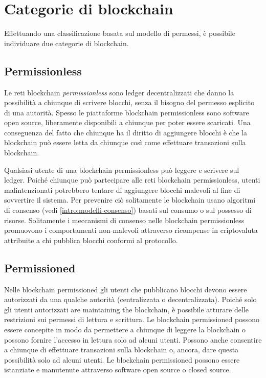 \section{Categorie di blockchain}
Effettuando una classificazione basata sul modello di permessi,
è possibile individuare due categorie di blockchain.

\subsection{Permissionless}
\label{intro:permissionless}
Le reti blockchain \textit{permissionless} sono ledger decentralizzati che danno la possibilità
a chiunque di scrivere blocchi, senza il bisogno del permesso esplicito di una autorità.
Spesso le piattaforme blockchain permissionless sono software open source, liberamente
disponibili a chiunque per poter essere scaricati. Una conseguenza del fatto che
chiunque ha il diritto di aggiungere blocchi è che la blockchain può essere letta da chiunque
così come effettuare transazioni sulla blockchain.

Qualsiasi utente di una blockchain permissionless può leggere e scrivere sul ledger.
Poiché chiunque può partecipare alle reti blockchain permissionless, utenti malintenzionati
potrebbero tentare di aggiungere blocchi malevoli al fine di sovvertire il sistema.
Per prevenire ciò solitamente le blockchain usano algoritmi di consenso
(vedi \ref{intro:modelli-consenso}) basati sul consumo o sul possesso di risorse.
Solitamente i meccanismi di consenso nelle blockchain
permissionless promuovono i comportamenti non-malevoli attraverso ricompense in criptovaluta
attribuite a chi pubblica blocchi conformi al protocollo.

\subsection{Permissioned}
Nelle blockchain permissioned gli utenti che pubblicano blocchi devono essere autorizzati da una
qualche autorità (centralizzata o decentralizzata). Poiché solo gli utenti autorizzati are maintaining
the blockchain, è possibile atturare delle restrizioni sui permessi di lettura e scrittura.
Le blockchain permissioned possono essere concepite in modo da permettere a chiunque di
leggere la blockchain o possono fornire l'accesso in lettura solo ad alcuni utenti.
Possono anche consentire a chiunque di effettuare transazioni sulla blockchain o, ancora,
dare questa possibilità solo ad alcuni utenti. Le blockchain permissioned possono essere
istanziate e manutenute attraverso software open source o closed source.

